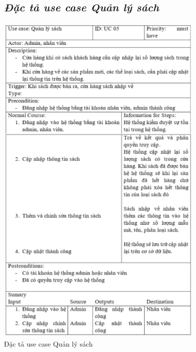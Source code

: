 \documentclass{report}
\begin{document}
\begin{figure}[htp]
    \subsection{\textit{Đặc tả use case Quản lý sách}}
    \centering
    \includegraphics[scale = 1.34]{image/UC05.PNG}
    \caption{Đặc tả use case Quản lý sách}
\end{figure}

\pagebreak
\end{document}
